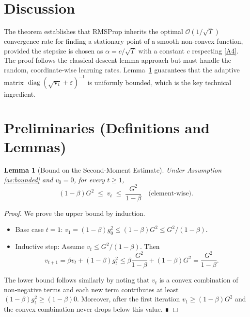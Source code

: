 \documentclass{article}
\newtheorem{lemma}{Lemma}
\begin{document}
\section*{Discussion}
The theorem establishes that RMSProp inherits the optimal
$\mathcal O(1/\sqrt{T})$ convergence rate for finding a stationary point of a
smooth non‑convex function, provided the stepsize is chosen as $\alpha= c /
\sqrt{T}$ with a constant $c$ respecting \eqref{A4}.  The proof follows the
classical descent‑lemma approach but must handle the random, coordinate‑wise
learning rates.  Lemma~\ref{lem:vt-bound} guarantees that the adaptive matrix
$\operatorname{diag}(\sqrt{\bm v_{t}}+\varepsilon)^{-1}$ is uniformly bounded,
which is the key technical ingredient.

\section*{Preliminaries (Definitions and Lemmas)}
\begin{lemma}[Bound on the Second‑Moment Estimate]\label{lem:vt-bound}
Under Assumption \ref{as:bounded} and $v_{0}=0$, for every $t\ge1$,
\[
(1-\beta)G^{2}\;\le\; v_{t}\;\le\;\frac{G^{2}}{1-\beta}\quad\text{(element‑wise)}.
\tag{4}
\]
\end{lemma}
\begin{proof}
We prove the upper bound by induction.
\begin{itemize}
\item[$\bullet$] Base case $t=1$: $v_{1}=(1-\beta)g_{0}^{2}\le (1-\beta)G^{2}\le G^{2}/(1-\beta)$.
\item[$\bullet$] Inductive step: Assume $v_{t}\le G^{2}/(1-\beta)$. Then
\[
v_{t+1}= \beta v_{t}+(1-\beta)g_{t}^{2}
\le \beta\frac{G^{2}}{1-\beta}+(1-\beta)G^{2}
= \frac{G^{2}}{1-\beta}.
\]
\end{itemize}
The lower bound follows similarly by noting that $v_{t}$ is a convex
combination of non‑negative terms and each new term contributes at least
$(1-\beta)g_{t}^{2}\ge (1-\beta)0$.  Moreover, after the first iteration
$v_{1}\ge (1-\beta)G^{2}$ and the convex combination never drops below this
value.  ∎
\end{proof}
\end{document}
